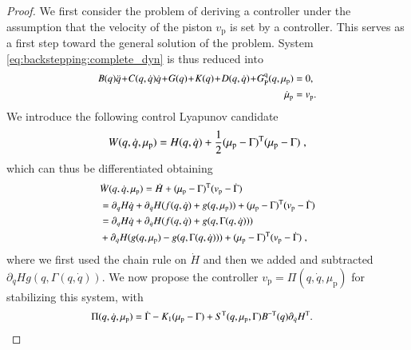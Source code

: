 \begin{proof}
	
	We first consider the problem of deriving a controller under the assumption that the velocity of the piston $v_\mathrm{p}$ is set by a controller. This serves as a first step toward the general solution of the problem. System \eqref{eq:backstepping:complete_dyn} is thus reduced into
	\begin{equation}\small\label{eq:backstepping:intermediate}\small
	\begin{split}
	B(q)\ddot{q} \! + \! C(q,\dot{q})\dot{q} \! + \! G(q) \! + \! K(q) \! + \! D(q,\dot{q}) \! + \! G_{\mathrm{P}}^{\mathrm{q}}(q,\mu_\mathrm{p}) &= 0, \\
	\dot{\mu}_\mathrm{p} &= v_\mathrm{p}. 
	\end{split}
	\end{equation}
	We introduce the following control Lyapunov candidate
	\begin{equation}\small
		W(q,\dot{q},\mu_\mathrm{p}) = H(q,\dot{q}) + \frac{1}{2}(\mu_\mathrm{p} - \Gamma)^{\mathrm{T}}(\mu_\mathrm{p} - \Gamma)\;,
	\end{equation}
	which can thus be differentiated obtaining
	\begin{equation}\small
		\begin{split}
			&\dot{W}(q,\dot{q},\mu_\mathrm{p}) = 
			\dot{H} + (\mu_\mathrm{p} - \Gamma)^{\mathrm{T}}(v_\mathrm{p} - \dot\Gamma) \\
			& =  \partial_{q} H \dot{q} + \partial_{\dot{q}} H (f(q,\dot{q}) + g(q,\mu_\mathrm{p})) + (\mu_\mathrm{p} - \Gamma)^{\mathrm{T}}(v_\mathrm{p} - \dot\Gamma) \\
			& = \partial_{q} H \dot{q} + \partial_{\dot{q}} H (f(q,\dot{q}) + g(q,\Gamma(q,\dot{q}))) \\
			&+ \partial_{\dot{q}} H (g(q,\mu_\mathrm{p}) - g(q,\Gamma(q,\dot{q}))) + (\mu_\mathrm{p} - \Gamma)^{\mathrm{T}} (v_\mathrm{p} - \dot\Gamma)\;,
		\end{split}
	\end{equation}
	where we first used the chain rule on $\dot{H}$ and then we added and subtracted $\partial_{\dot{q}} H g(q,\Gamma(q,\dot{q}))$.
	We now propose the controller $v_\mathrm{p} = \Pi(q,\dot{q},\mu_\mathrm{p})$ for stabilizing this system, with
	\begin{equation*}\small
		\begin{split}
			\Pi(q,\dot{q},\mu_\mathrm{p}) &= \dot{\Gamma} - K_1 (\mu_\mathrm{p} - \Gamma) + S^{\mathrm{T}}(q,\mu_\mathrm{p},\Gamma)B^{-\mathrm{T}}(q)\partial_{\dot{q}} H^{\mathrm{T}}.

\end{split}
\end{equation*}
\end{proof}
